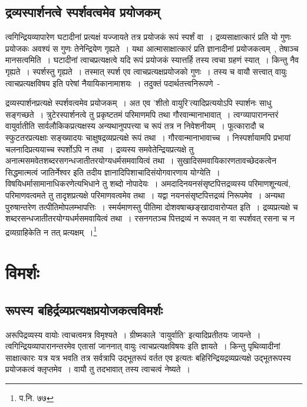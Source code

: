 		\subsection{द्रव्यस्पार्शनत्वे स्पर्शवत्वमेव प्रयोजकम्}

		त्वगिन्द्रियव्यापारेण घटादीनां प्रत्यक्षं यज्जायते तत्र प्रयोजकं रूपं स्पर्शं वा~। द्रव्यसाक्षात्कारं प्रति यो गुणः प्रयोजकः अवश्यं स गुणः तेनेन्द्रियेण गृह्यते~। यथा आत्मासाक्षात्कारं प्रति ज्ञानादीनां प्रयोजकत्वम्~, तेषाञ्च मानसत्वमिति~। घटादीनां त्वाचप्रत्यक्षत्वे यदि रूपं प्रयोजकं स्यात्तर्हि तस्य त्वचा ग्रहणं स्यात्~। किन्तु नैव गृह्यते~। स्पर्शस्तु गृह्यते~। तस्मात् स्पर्श एव त्वाचप्रत्यक्षप्रयोजको गुणः~। तस्य च वायौ सत्त्वात् वायुः त्वाचप्रत्यक्षविषय इति परेषां नैयायिकानामाशयः~। तदुक्तं पदार्थतत्त्वनिरूपणे~-

		{\fontsize{11.7}{0}\selectfont\s द्रव्यस्पार्शनप्रत्यक्षे स्पर्शवत्वमेव प्रयोजकम्~। अत एव 'शीतो वायुरि'त्यादिप्रत्ययोऽपि स्पार्शनः साधु सङ्गच्छते~। त्रुटेरस्पार्शनत्वे तु प्रकृष्टतमं परिमाणमपि तथा गौरवान्मानाभावात्~।	त्वग्व्यापारानन्तरं वायुर्वातीति सार्वलौकिकप्रत्यक्षस्य अन्यथानुपपत्त्या च रूपं तत्र न निवेशनीयम्~। फूत्कारादौ च स्फुटतरप्रत्यक्षाः सङ्ख्यादयः चाक्षुषद्रव्यप्रत्यक्षे रूपं तथा~। गौरवान्मानाभावाच्च~। निस्पर्शायामपि प्रभायां चलनादिप्रत्ययाच्च  स्पर्शोऽपि न तथा~। द्रव्यस्य समवेतेन्द्रियप्रत्यक्षे तु अनात्मसमवेतशब्दरसगन्धजातीतरयोग्यधर्मसमवायित्वं तथा~। सुखादिसमवायिकारणतावच्छेदकत्वेन सिद्धमात्मत्वं जातिर्नेश्वर इति तदीय ज्ञानादिपिशाचादिसंयोगवारणाय योग्येति~। विषयिधर्मासामानाधिकरणेत्यभिधाने तु शब्दो नोपादेयः~। अमदादिनयनसंसृष्टपित्तद्रव्यस्य परिमाणशून्यत्वं, परिमाणवत्वमते तु तादृशप्रत्यक्षे परिमाणवत्वमेव तथा~। यद्वा नयनसंसृष्टपित्तद्रव्यं निरूपमेव~। अन्यथा पुरुषान्तरेण तत्पीतिमोपलम्भापत्तिः~। स्मर्यमाणस्तु पीतिमा दोशवषाच्छङ्खादावारोप्यत इति~। द्रव्यप्रत्यक्षे च शब्दरसन्धजातीतरयोग्यधर्मसमवायित्वं तथा~। रसनगतञ्च पित्तद्रव्यं न रूपवत् न वा स्पर्शवत् रसना च न द्रव्यग्राहिकेति न तत् प्रत्यक्षम्~।\footnote{प.नि. ७७}}

	\section{विमर्शः}

		\subsection{रूपस्य बहिर्द्रव्यप्रत्यक्षप्रयोजकत्वविमर्शः}

		अरूपिद्रव्यस्य वायोः त्वाचत्वमत्र विमृश्यते~। ग्रीष्मकाले 'वायुर्वाति' इत्यादिप्रतीतयः जायन्ते~। त्वगिन्द्रियव्यापारानन्तरमेव एतासां जाननात् वायुः त्वाचप्रत्यक्षविषयः इति ज्ञायते~। किन्तु पृथिव्यादीनां साक्षात्कारः यत्र यत्र भवति तत्र सर्वत्रापि उद्भूतरूपं वर्तत एव इत्यतः बहिरिन्द्रियद्रव्यप्रत्यक्षे उद्भूतरूपस्य प्रयोजकत्वं क्लृप्तमेव~। वायौ तु तदभावात् तस्य त्वाचत्वं नेष्यते~। 

